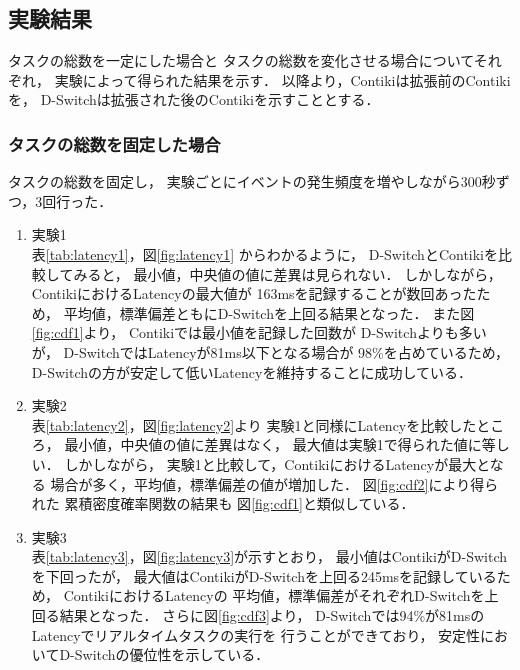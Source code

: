 \subsection{実験結果}\label{sec:result_latency}
タスクの総数を一定にした場合と
タスクの総数を変化させる場合についてそれぞれ，
実験によって得られた結果を示す．
以降より，Contikiは拡張前のContikiを，
D-Switchは拡張された後のContikiを示すこととする．

\subsubsection{タスクの総数を固定した場合}

\vspace{0.5em}タスクの総数を固定し，
実験ごとにイベントの発生頻度を増やしながら300秒ずつ，3回行った．

\begin{enumerate}
\item{実験1}\\
表\ref{tab:latency1}，図\ref{fig:latency1}
からわかるように，
D-SwitchとContikiを比較してみると，
最小値，中央値の値に差異は見られない．
しかしながら，
ContikiにおけるLatencyの最大値が
163msを記録することが数回あったため，
平均値，標準偏差ともにD-Switchを上回る結果となった．
また図\ref{fig:cdf1}より，
Contikiでは最小値を記録した回数が
D-Switchよりも多いが，
D-SwitchではLatencyが81ms以下となる場合が
98\%を占めているため，
D-Switchの方が安定して低いLatencyを維持することに成功している．
\newline
\item{実験2}\\
表\ref{tab:latency2}，図\ref{fig:latency2}より
実験1と同様にLatencyを比較したところ，
最小値，中央値の値に差異はなく，
最大値は実験1で得られた値に等しい．
しかしながら，
実験1と比較して，ContikiにおけるLatencyが最大となる
場合が多く，平均値，標準偏差の値が増加した．
図\ref{fig:cdf2}により得られた
累積密度確率関数の結果も
図\ref{fig:cdf1}と類似している．
\newline
\item{実験3}\\
表\ref{tab:latency3}，図\ref{fig:latency3}が示すとおり，
最小値はContikiがD-Switchを下回ったが，
最大値はContikiがD-Switchを上回る245msを記録しているため，
ContikiにおけるLatencyの
平均値，標準偏差がそれぞれD-Switchを上回る結果となった．
さらに図\ref{fig:cdf3}より，
D-Switchでは94\%が81msのLatencyでリアルタイムタスクの実行を
行うことができており，
安定性においてD-Switchの優位性を示している．
\end{enumerate}


